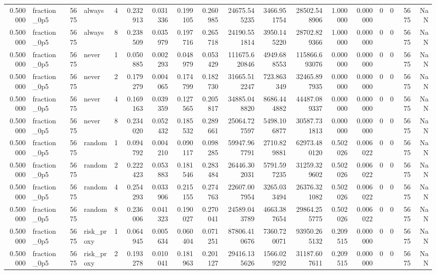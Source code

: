 \begin{tabular}{rlrlrrrrrrrrrrrrrr}
0.500000 & fraction\_0p5 & 5675 & always & 4 & 0.232913 & 0.031336 & 0.199105 & 0.260985 & 24675.545235 & 3466.951754 & 28502.548906 & 1.000000 & 0.000000 & 0 & 0 & 5675 & NaN \\
0.500000 & fraction\_0p5 & 5675 & always & 8 & 0.238509 & 0.035979 & 0.197716 & 0.265718 & 24190.551814 & 3950.145220 & 28702.829366 & 1.000000 & 0.000000 & 0 & 0 & 5675 & NaN \\
0.500000 & fraction\_0p5 & 5675 & never & 1 & 0.050885 & 0.002293 & 0.048979 & 0.053429 & 111675.620846 & 4949.688553 & 115866.693076 & 0.000000 & 0.000000 & 0 & 0 & 5675 & NaN \\
0.500000 & fraction\_0p5 & 5675 & never & 2 & 0.179279 & 0.004065 & 0.174799 & 0.182730 & 31665.512247 & 723.863349 & 32465.897935 & 0.000000 & 0.000000 & 0 & 0 & 5675 & NaN \\
0.500000 & fraction\_0p5 & 5675 & never & 4 & 0.169163 & 0.039359 & 0.127565 & 0.205817 & 34885.048820 & 8686.444882 & 44487.089337 & 0.000000 & 0.000000 & 0 & 0 & 5675 & NaN \\
0.500000 & fraction\_0p5 & 5675 & never & 8 & 0.234020 & 0.052432 & 0.185532 & 0.289661 & 25064.727597 & 5498.106877 & 30587.731813 & 0.000000 & 0.000000 & 0 & 0 & 5675 & NaN \\
0.500000 & fraction\_0p5 & 5675 & random & 1 & 0.094792 & 0.004210 & 0.090117 & 0.098285 & 59947.967791 & 2710.829881 & 62973.480120 & 0.502026 & 0.006022 & 0 & 0 & 5675 & NaN \\
0.500000 & fraction\_0p5 & 5675 & random & 2 & 0.222423 & 0.053883 & 0.181546 & 0.283484 & 26446.302031 & 5791.597235 & 31259.329602 & 0.502026 & 0.006022 & 0 & 0 & 5675 & NaN \\
0.500000 & fraction\_0p5 & 5675 & random & 4 & 0.254293 & 0.033906 & 0.215155 & 0.274763 & 22607.007954 & 3265.033494 & 26376.321082 & 0.502026 & 0.006022 & 0 & 0 & 5675 & NaN \\
0.500000 & fraction\_0p5 & 5675 & random & 8 & 0.236006 & 0.041323 & 0.190027 & 0.270041 & 24589.043789 & 4663.387654 & 29864.255775 & 0.502026 & 0.006022 & 0 & 0 & 5675 & NaN \\
0.500000 & fraction\_0p5 & 5675 & risk\_proxy & 1 & 0.064945 & 0.005634 & 0.060404 & 0.071251 & 87806.410676 & 7360.720071 & 93950.265132 & 0.209515 & 0.000000 & 0 & 0 & 5675 & NaN \\
0.500000 & fraction\_0p5 & 5675 & risk\_proxy & 2 & 0.193278 & 0.010041 & 0.181963 & 0.201127 & 29416.135626 & 1566.029292 & 31187.607611 & 0.209515 & 0.000000 & 0 & 0 & 5675 & NaN \\

\end{tabular}
